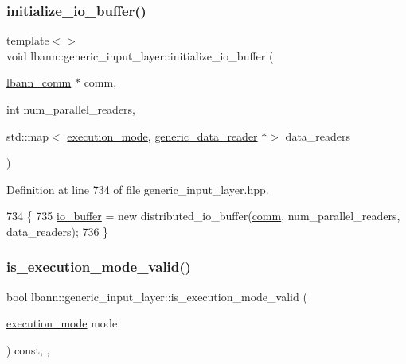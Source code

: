 \subsubsection{\texorpdfstring{initialize\+\_\+io\+\_\+buffer()}{initialize\_io\_buffer()}\hspace{0.1cm}{\footnotesize\ttfamily [3/3]}}
{\footnotesize\ttfamily template$<$$>$ \\
void lbann\+::generic\+\_\+input\+\_\+layer\+::initialize\+\_\+io\+\_\+buffer (\begin{DoxyParamCaption}\item[{\hyperlink{classlbann_1_1lbann__comm}{lbann\+\_\+comm} $\ast$}]{comm,  }\item[{int}]{num\+\_\+parallel\+\_\+readers,  }\item[{std\+::map$<$ \hyperlink{base_8hpp_a2781a159088df64ed7d47cc91c4dc0a8}{execution\+\_\+mode}, \hyperlink{classlbann_1_1generic__data__reader}{generic\+\_\+data\+\_\+reader} $\ast$$>$}]{data\+\_\+readers }\end{DoxyParamCaption})\hspace{0.3cm}{\ttfamily [inline]}}



Definition at line 734 of file generic\+\_\+input\+\_\+layer.\+hpp.


\begin{DoxyCode}
734                                                                                                            
                                                                                         \{
735   \hyperlink{classlbann_1_1generic__input__layer_a9dfe8b9afaebc7a5bcb0177ee2ab428f}{io\_buffer} = \textcolor{keyword}{new} distributed\_io\_buffer(\hyperlink{file__io_8cpp_ab048c6f9fcbcfaa57ce68b00263dbebe}{comm}, num\_parallel\_readers, data\_readers);
736 \}
\end{DoxyCode}
\mbox{\label{classlbann_1_1generic__input__layer_a31082076a8aad937eef3cadc0b5e1b27}} 
\subsubsection{\texorpdfstring{is\+\_\+execution\+\_\+mode\+\_\+valid()}{is\_execution\_mode\_valid()}}
{\footnotesize\ttfamily bool lbann\+::generic\+\_\+input\+\_\+layer\+::is\+\_\+execution\+\_\+mode\+\_\+valid (\begin{DoxyParamCaption}\item[{\hyperlink{base_8hpp_a2781a159088df64ed7d47cc91c4dc0a8}{execution\+\_\+mode}}]{mode }\end{DoxyParamCaption}) const\hspace{0.3cm}{\ttfamily [inline]}, {\ttfamily [override]}, {\ttfamily [virtual]}}



